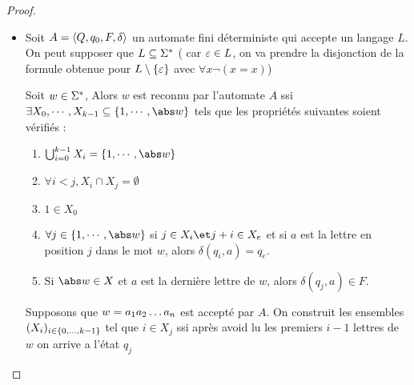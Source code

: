 \begin{proof}
	\begin{itemize}
		\item \fbox{$\Leftarrow$}

		      Soit $A = \langle Q, q_0, F, \delta \rangle$ un automate fini déterministe qui accepte un langage $L$.  On peut supposer que $L \subseteq \Sigma^{*}$ (
		      car $\varepsilon \in L$, on va prendre la disjonction de la formule obtenue pour $L \setminus \left\{\varepsilon\right\}$ avec $\forall x \neg (x = x)$)

		      Soit $w \in \Sigma^{*}$, Alors $w$ est reconnu par l'automate $A$ ssi $\exists X_0,\cdots,X_{k-1} \subseteq \set{1, \cdots , \abs w}$
		      tels que les propriétés suivantes soient vérifiés :
		      \begin{enumerate}
			      \item $\bigcup_{i=0}^{k - 1} X_i = \set{1, \cdots, \abs w}$
			      \item $\forall i < j, X_i \cap X_j = \emptyset$
			      \item $1 \in X_0$
			      \item $\forall j \in \set{1, \cdots, \abs w}$ si $j \in X_i \et j+i \in X_e$ et si $a$ est la lettre en position $j$ dans le mot
			            $w$, alors $\delta (q_i,a) = q_e$.

			      \item Si $\abs w \in X$ et $a$ est la dernière lettre de $w$, alors $\delta (q_j,a) \in F$.
		      \end{enumerate}

		      Supposons que $w = a_1 a_2 \ldots a_{n}$ est accepté par $A$. On construit les ensembles $(X_i)_{i \in \left\{0,\ldots,k-1\right\}}$
		      tel que $i \in X_j$ ssi après avoid lu les premiers $i-1$ lettres de $w$ on arrive a l'état $q_j$


\end{itemize}
\end{proof}
